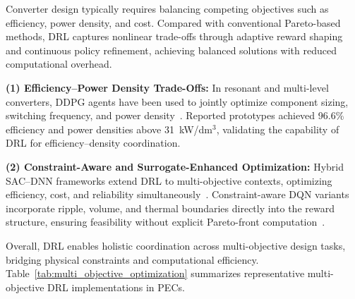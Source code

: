 Converter design typically requires balancing competing objectives such as efficiency, power density, and cost.  
Compared with conventional Pareto-based methods, DRL captures nonlinear trade-offs through adaptive reward shaping and continuous policy refinement, achieving balanced solutions with reduced computational overhead.

\textbf{(1) Efficiency–Power Density Trade-Offs:}  
In resonant and multi-level converters, DDPG agents have been used to jointly optimize component sizing, switching frequency, and power density~\cite{wang2023efficiency,wang2024case}.  
Reported prototypes achieved 96.6\% efficiency and power densities above 31~kW/dm$^3$, validating the capability of DRL for efficiency–density coordination.

\textbf{(2) Constraint-Aware and Surrogate-Enhanced Optimization:}  
Hybrid SAC–DNN frameworks extend DRL to multi-objective contexts, optimizing efficiency, cost, and reliability simultaneously~\cite{bui2022deep}.  
Constraint-aware DQN variants incorporate ripple, volume, and thermal boundaries directly into the reward structure, ensuring feasibility without explicit Pareto-front computation~\cite{tian2022deep}.  

Overall, DRL enables holistic coordination across multi-objective design tasks, bridging physical constraints and computational efficiency.  
Table~\ref{tab:multi_objective_optimization} summarizes representative multi-objective DRL implementations in PECs.

